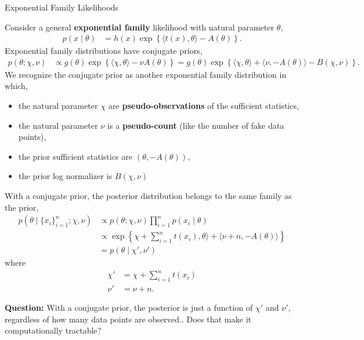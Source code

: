 \documentclass[aspectratio=169]{beamer}
\begin{document}
\begin{frame}[t,allowframebreaks]{Exponential Family
Likelihoods}\label{exponential-family-likelihoods}

Consider a general \textbf{exponential family} likelihood with natural
parameter \(\theta\), \begin{align*}
    p(x \mid \theta) &= h(x) \exp \left \{\langle t(x), \theta \rangle - A(\theta) \right \}.
\end{align*}
Exponential family distributions have conjugate priors, \begin{align*}
    p(\theta; \chi, \nu) 
    &\propto g(\theta) \exp \left \{ \langle \chi, \theta \rangle - \nu A(\theta) \right \}
    = g(\theta) \exp \left\{ \langle \chi, \theta \rangle + \langle \nu, -A(\theta) \rangle - B(\chi, \nu) \right\}.
\end{align*} 
We recognize the conjugate prior as another exponential
family distribution in which, 
\begin{itemize}
    \item the natural parameter \(\chi\) are
\textbf{pseudo-observations} of the sufficient statistics,
    \item the natural parameter \(\nu\) is a
\textbf{pseudo-count} (like the number of fake data points), 
    \item the prior sufficient statistics are \((\theta, -A(\theta))\), 
    \item the prior log normalizer is \(B(\chi, \nu)\)
\end{itemize}

With a conjugate prior, the posterior distribution belongs to the same
family as the prior, \begin{align*}
p(\theta \mid \{x_i\}_{i=1}^n; \chi, \nu)
&\propto p(\theta; \chi, \nu) \prod_{i=1}^n p(x_i \mid \theta) \\
&\propto \exp \left\{ \chi + \sum_{i=1}^n t(x_i), \theta \rangle + \langle \nu + n, -A(\theta) \rangle \right\} \\
&= p(\theta \mid \chi', \nu')
\end{align*} where \begin{align*}
\chi' &= \chi + \sum_{i=1}^n t(x_i) \\
\nu' &= \nu + n.
\end{align*}

\textbf{Question:} With a conjugate prior, the posterior
is just a function of \(\chi'\) and \(\nu'\), regardless of how many data points
are observed.. Does that make it
computationally tractable? 

\end{frame}
\end{document}
